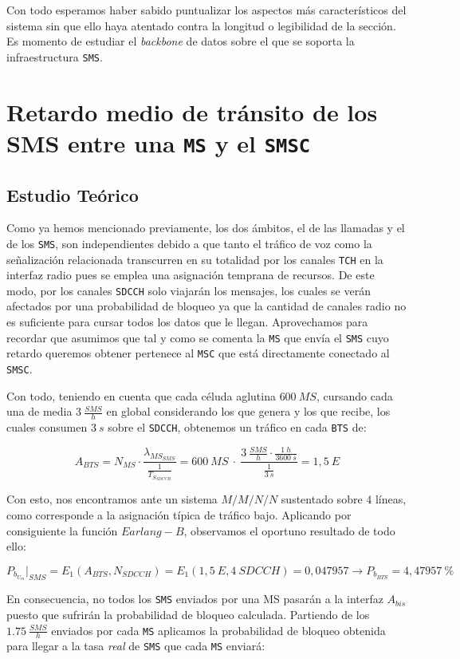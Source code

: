 \documentclass[10pt]{article}
\begin{document}
				Con todo esperamos haber sabido puntualizar los aspectos más característicos del sistema sin que ello haya atentado contra la longitud o legibilidad de la sección. Es momento de estudiar el \textit{backbone} de datos sobre el que se soporta la infraestructura \texttt{SMS}.

	\section{Retardo medio de tránsito de los SMS entre una \texttt{MS} y el \texttt{SMSC}}
		\subsection{Estudio Teórico}
			Como ya hemos mencionado previamente, los dos ámbitos, el de las llamadas y el de los \texttt{SMS}, son independientes debido a que tanto el tráfico de voz como la señalización relacionada transcurren en su totalidad por los canales \texttt{TCH} en la interfaz radio pues se emplea una asignación temprana de recursos. De este modo, por los canales \texttt{SDCCH} solo viajarán los mensajes, los cuales se verán afectados por una probabilidad de bloqueo ya que la cantidad de canales radio no es suficiente para cursar todos los datos que le llegan. Aprovechamos para recordar que asumimos que tal y como se comenta la \texttt{MS} que envía el \texttt{SMS} cuyo retardo queremos obtener pertenece al \texttt{MSC} que está directamente conectado al \texttt{SMSC}.

			Con todo, teniendo en cuenta que cada céluda aglutina $600\ MS$, cursando cada una de media $3\ \frac{SMS}{h}$ en global considerando los que genera y los que recibe, los cuales consumen $3\ s$ sobre el \texttt{SDCCH}, obtenemos un tráfico en cada \texttt{BTS} de:

			$$A_{BTS} = N_{MS} \cdot \frac{\lambda_{MS_{SMS}}}{\frac{1}{T_{S_{SDCCH}}}} = 600\ MS\ \cdot\ \frac{3\ \frac{SMS}{h} \cdot \frac{1\ h}{3600\ s}}{\frac{1}{3\ s}} = 1,5\ E$$

			Con esto, nos encontramos ante un sistema $M/M/N/N$ sustentado sobre $4$ líneas, como corresponde a la asignación típica de tráfico bajo. Aplicando por consiguiente la función $Earlang-B$, observamos el oportuno resultado de todo ello:

			$$P_{b_{U_m}}\bigr\rvert_{SMS} = E_1(A_{BTS}, N_{SDCCH}) = E_1(1,5\ E, 4\ SDCCH) = 0,047957 \rightarrow P_{b_{BTS}} = 4,47957\ \%$$

			En consecuencia, no todos los \texttt{SMS} enviados por una MS pasarán a la interfaz $A_{bis}$ puesto que sufrirán la probabilidad de bloqueo calculada. Partiendo de los $1.75\ \frac{SMS}{h}$ enviados por cada \texttt{MS} aplicamos la probabilidad de bloqueo obtenida para llegar a la tasa \textit{real} de \texttt{SMS} que cada \texttt{MS} enviará:
\end{document}
